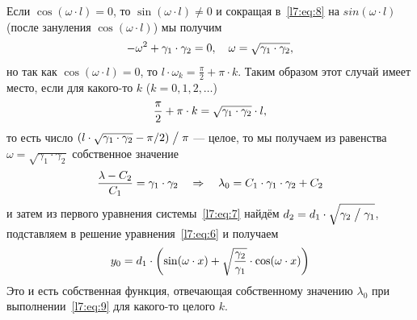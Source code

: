 Если $\cos(\omega\cdot l)=0$, то $\sin(\omega\cdot l)\neq0$ и сокращая в~\eqref{l7:eq:8} на $sin(\omega\cdot l)$ (после зануления $\cos(\omega\cdot l)$) мы получим 
\begin{equation*}
	\hfill-\omega^2+\gamma_1\cdot\gamma_2=0,\quad\omega=\sqrt{\gamma_1\cdot\gamma_2},\hfill
\end{equation*}
но так как $\cos(\omega\cdot l)=0$, то $l\cdot\omega_k=\displaystyle\frac{\pi}{2}+\pi\cdot k$. Таким образом этот случай имеет место, если для какого-то $k$ ($k=0,1,2,\ldots$)
\begin{equation}
	\label{l7:eq:9}
	\hfill\frac{\pi}{2}+\pi\cdot k=\sqrt{\gamma_1\cdot\gamma_2}\cdot l,\hfill
\end{equation} 
то есть число $(l\cdot\sqrt{\gamma_1\cdot\gamma_2}-\pi/2)\bigm/\pi$ --- целое, то мы получаем из равенства $\omega=\sqrt{\gamma_1\cdot\gamma_2}$ собственное значение 
\begin{equation*}
	\hfill\frac{\lambda-C_2}{C_1}=\gamma_1\cdot\gamma_2\quad\Rightarrow\quad\lambda_0=C_1\cdot\gamma_1\cdot\gamma_2+C_2\hfill
\end{equation*}
и затем из первого уравнения системы~\eqref{l7:eq:7} найдём $d_2=d_1\cdot\sqrt{\gamma_2\bigm/\gamma_1}$, подставляем в решение уравнения~\eqref{l7:eq:6} и получаем 
\begin{equation*}
	\hfill y_0=d_1\cdot\left(\sin(\omega\cdot x)+\sqrt{\frac{\gamma_2}{\gamma_1}}\cdot\cos(\omega\cdot x)\right)\hfill
\end{equation*}
Это и есть собственная функция, отвечающая собственному значению $\lambda_0$ при выполнении~\eqref{l7:eq:9} для какого-то целого $k$. 

